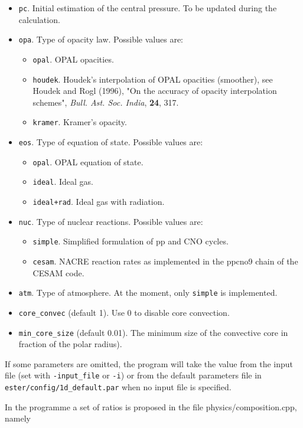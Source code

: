 \begin{itemize}
\item {\tt pc}. Initial estimation of the central pressure. To be updated during the
calculation.
\item {\tt opa}. Type of opacity law. Possible values are:
\begin{itemize}
\item {\tt opal}. OPAL opacities.
\item {\tt houdek}. Houdek's interpolation of OPAL opacities (smoother),
see Houdek and Rogl (1996), "On the accuracy of opacity interpolation
schemes", {\it Bull. Ast. Soc. India}, {\bf 24}, 317.
\item {\tt kramer}. Kramer's opacity.
\end{itemize}
\item {\tt eos}. Type of equation of state. Possible values are:
\begin{itemize}
\item {\tt opal}. OPAL equation of state.
\item {\tt ideal}. Ideal gas.
\item {\tt ideal+rad}. Ideal gas with radiation.
\end{itemize}
\item {\tt nuc}. Type of nuclear reactions. Possible values are:
\begin{itemize}
\item {\tt simple}. Simplified formulation of pp and CNO cycles. 
\item {\tt cesam}. NACRE reaction rates as implemented in the ppcno9 chain of the CESAM code.
\end{itemize}
\item {\tt atm}. Type of atmosphere. At the moment, only {\tt simple} is implemented.
\item {\tt core\_convec} (default 1). Use 0 to disable core convection.
\item {\tt min\_core\_size} (default 0.01). The minimum size of the convective core
in fraction of the polar radius).
\end{itemize}
If some parameters are omitted, the program will take the value from the input file (set with
{\tt -input\_file} or {\tt -i}) or from the default parameters file in 
{\tt ester/config/1d\_default.par} when no input file is specified.

\bigskip
{} In the programme a set of
ratios is proposed in the file physics/composition.cpp, namely

